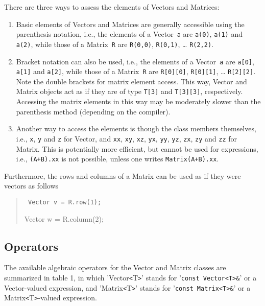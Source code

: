 \documentclass[12pt,twoside]{article}
\newcommand{\Vector}{{Vector}}
\newcommand{\Matrix}{{Matrix}}
\newcommand{\TT}{{\tt<}T{\tt>}}
\begin{document}
There are three ways to assess the elements of Vectors and Matrices:

\begin{enumerate}

\item Basic elements of Vectors and Matrices are generally accessible using the
parenthesis notation, i.e., the elements of a  \Vector\ \texttt a are
\texttt{a(0)}, \texttt{a(1)} and \texttt{a(2)}, while those of a
\Matrix\ \texttt R are \texttt{R(0,0)}, \texttt{R(0,1)}, \dots
\texttt{R(2,2)}.

\item Bracket notation can also be used, 
 i.e., the elements of a  \Vector\ \texttt a are
\texttt{a[0]}, \texttt{a[1]} and \texttt{a[2]}, while those of a
\Matrix\ \texttt R are \texttt{R[0][0]}, \texttt{R[0][1]}, \dots
\texttt{R[2][2]}. Note the double brackets for matrix element access.
This way, Vector and Matrix objects act as if they are of type \texttt{T[3]} and \texttt{T[3][3]}, respectively. Accessing the matrix elements in this way may be moderately slower than the parenthesis method (depending on the compiler).

\item Another way to access the elements is though the class members
themselves, i.e., \texttt x, \texttt y and \texttt z for \Vector, and
\texttt{xx}, \texttt{xy}, \texttt{xz}, \texttt{yx}, \texttt{yy},
\texttt{yz}, \texttt{zx}, \texttt{zy} and \texttt{zz} for Matrix. This is
potentially  more efficient, but cannot be used for expressions, i.e.,
\texttt{(A+B).xx} is not possible, unless one writes \texttt{Matrix(A+B).xx}.
\end{enumerate}
Furthermore, the rows and columns of a Matrix can be used as if they
were vectors as follows
\begin{quote}\tt
  Vector v = R.row(1);

  Vector w = R.column(2);
\end{quote}


\subsection{Operators}
\label{operations}


The available algebraic operators for the Vector and Matrix classes
are summarized in table 1, in which '\Vector\TT' stands for
'\texttt{const Vector\TT\&}' or a \Vector-valued expression, and '\Matrix\TT'
stands for '\texttt{const Matrix\TT\&}' or a Matrix\TT-valued expression.
\end{document}
